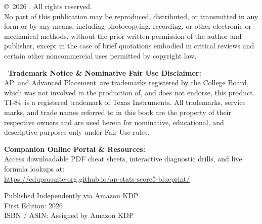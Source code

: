 \newpage
\thispagestyle{empty}
\vspace*{2.8in}

\noindent \copyright\ 2026 \BookAuthor. All rights reserved.\\
No part of this publication may be reproduced, distributed, or transmitted in any form or by any means, including photocopying, recording, or other electronic or mechanical methods, without the prior written permission of the author and publisher, except in the case of brief quotations embodied in critical reviews and certain other noncommercial uses permitted by copyright law.

\vspace{0.4in}

\noindent \textbf{\textregistered\ Trademark Notice \& Nominative Fair Use Disclaimer:}\\
\small{AP\textregistered\ and Advanced Placement\textregistered\ are trademarks registered by the College Board, which was not involved in the production of, and does not endorse, this product. TI-84\textregistered\ is a registered trademark of Texas Instruments. All trademarks, service marks, and trade names referred to in this book are the property of their respective owners and are used herein for nominative, educational, and descriptive purposes only under Fair Use rules.}

\vspace{0.3in}

\noindent \textbf{Companion Online Portal \& Resources:}\\
Access downloadable PDF cheat sheets, interactive diagnostic drills, and live formula lookups at:\\
\url{https://eduprosuite-org.github.io/ap-stats-score5-blueprint/}

\vspace{0.2in}
\noindent Published Independently via Amazon KDP\\
First Edition: 2026\\
ISBN / ASIN: Assigned by Amazon KDP

